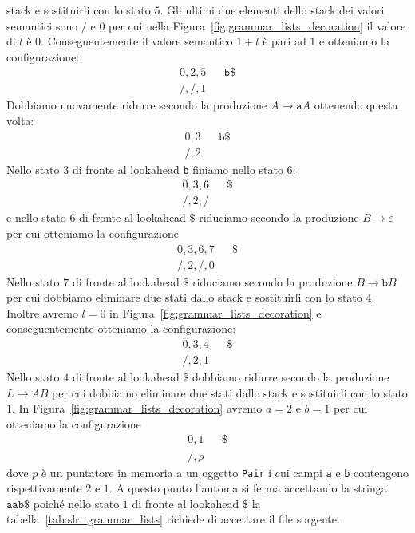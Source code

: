 stack e sostituirli con lo stato $5$. Gli ultimi due elementi dello stack
dei valori semantici sono $/$ e $0$ per cui nella
Figura~\ref{fig:grammar_lists_decoration} il valore di $l$ \`e $0$.
Conseguentemente il valore semantico $1+l$ \`e pari ad $1$ e otteniamo la
configurazione:
%
\begin{align*}
  0,2,5 & & \mathtt{b\$}\\
  /,/,1 & &
\end{align*}
%
Dobbiamo nuovamente ridurre secondo la produzione $A\to\mathtt{a}A$ ottenendo
questa volta:
%
\begin{align*}
  0,3 & & \mathtt{b\$}\\
  /,2 & &
\end{align*}
%
Nello stato $3$ di fronte al lookahead \texttt{b} finiamo nello stato $6$:
%
\begin{align*}
  0,3,6 & & \mathtt{\$}\\
  /,2,/ & &
\end{align*}
%
e nello stato $6$ di fronte al lookahead $\mathtt{\$}$ riduciamo secondo la
produzione $B\to\varepsilon$ per cui otteniamo la configurazione
%
\begin{align*}
  0,3,6,7 & & \mathtt{\$}\\
  /,2,/,0 & &
\end{align*}
%
Nello stato $7$ di fronte al lookahead $\mathtt{\$}$ riduciamo secondo la
produzione $B\to\mathtt{b}B$ per cui dobbiamo eliminare due stati dallo stack
e sostituirli con lo stato $4$. Inoltre avremo $l=0$ in
Figura~\ref{fig:grammar_lists_decoration} e conseguentemente otteniamo la
configurazione:
%
\begin{align*}
  0,3,4 & & \mathtt{\$}\\
  /,2,1 & &
\end{align*}
%
Nello stato $4$ di fronte al lookahead $\mathtt{\$}$ dobbiamo ridurre
secondo la produzione $L\to AB$ per cui dobbiamo eliminare due
stati dallo stack e sostituirli con lo stato $1$. In
Figura~\ref{fig:grammar_lists_decoration} avremo $a=2$ e $b=1$ per cui
otteniamo la configurazione
%
\begin{align*}
  0,1 & & \mathtt{\$}\\
  /,p & &
\end{align*}
%
dove $p$ \`e un puntatore in memoria a un oggetto \texttt{Pair} i cui campi
\texttt{a} e \texttt{b} contengono rispettivamente $2$ e $1$.
A questo punto l'automa si ferma accettando la stringa $\mathtt{aab\$}$
poich\'e nello stato $1$ di fronte al lookahead $\mathtt{\$}$ la
tabella~\ref{tab:slr_grammar_lists} richiede di accettare il file sorgente.

